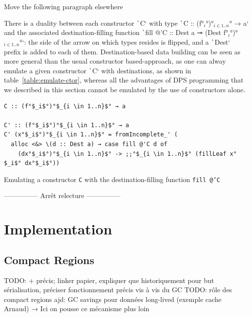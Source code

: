 \documentclass[english]{jflart}
\newcommand{\TODO}[1]{{\color{red}\large #1}}
\begin{document}
\TODO{Move the following paragraph elsewhere}

There is a duality between each constructor \texttt`C` with type \texttt`C :: (f°$_i$°)°$_{i \in 1..n}$° → a` and the associated destination-filling function \texttt`fill @'C :: Dest a ⊸ (Dest f°$_i$°)°$_{i \in 1..n}$°`: the side of the arrow on which types resides is flipped, and a \texttt`Dest` prefix is added to each of them. Destination-based data building can be seen as more general than the usual constructor based-approach, as one can alway emulate a given constructor \texttt`C` with destinations, as shown in table~\ref{table:emulate-ctor}, whereas all the advantages of DPS programming that we described in this section cannot be emulated by the use of constructors alone. 

\begin{table}[H]
\small
\begin{verbatim}
C :: (f°$_i$°)°$_{i \in 1..n}$° → a

C' :: (f°$_i$°)°$_{i \in 1..n}$° → a
C' (x°$_i$°)°$_{i \in 1..n}$° = fromIncomplete_' (
  alloc <&> \(d :: Dest a) → case fill @'C d of
    (dx°$_i$°)°$_{i \in 1..n}$° -> ;;°$_{i \in 1..n}$° (fillLeaf x°$_i$° dx°$_i$°))
\end{verbatim}
\caption{Emulating a constructor \texttt{C} with the destination-filling function \texttt{fill @'C}}
\label{table:emulate-ctor}
\end{table}

\clearpage{}

\TODO{--------------- Arrêt relecture ---------------}

\section{Implementation}\label{sec:implementation}

\subsection{Compact Regions}\label{ssec:impl-compact-regions}

TODO: + précis; linker papier, expliquer que historiquement pour but sérialisation, préciser fonctionnement précis vis à vis du GC
TODO: rôle des compact regions ajd: GC savings pour données long-lived (exemple cache Arnaud) → Ici on pousse ce mécanisme plus loin
\end{document}
